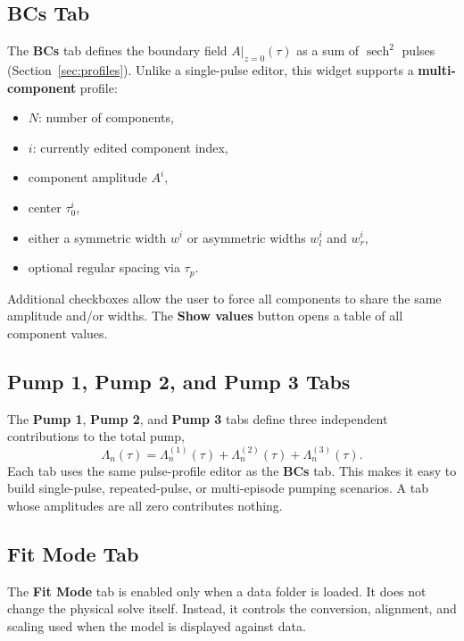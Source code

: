 \documentclass[12pt,a4paper]{article}
\newcommand{\tab}[1]{\textbf{#1}}
\newcommand{\sech}{\operatorname{sech}}
\begin{document}
\subsection{BCs Tab}

The \tab{BCs} tab defines the boundary field $A\vert_{z=0}(\tau)$ as a sum of
$\sech^2$ pulses (Section~\ref{sec:profiles}).
Unlike a single-pulse editor, this widget supports a \textbf{multi-component} profile:
\begin{itemize}[noitemsep]
  \item \textbf{$N$}: number of components,
  \item \textbf{$i$}: currently edited component index,
  \item component amplitude $A^i$,
  \item center $\tau_0^i$,
  \item either a symmetric width $w^i$ or asymmetric widths $w_l^i$ and $w_r^i$,
  \item optional regular spacing via $\tau_p$.
\end{itemize}

Additional checkboxes allow the user to force all components to share the same amplitude and/or widths.
The \textbf{Show values} button opens a table of all component values.

\subsection{Pump 1, Pump 2, and Pump 3 Tabs}

The \tab{Pump 1}, \tab{Pump 2}, and \tab{Pump 3} tabs define three
independent contributions to the total pump,
\begin{equation}
  \Lambda_n(\tau)=\Lambda_n^{(1)}(\tau)+\Lambda_n^{(2)}(\tau)+\Lambda_n^{(3)}(\tau).
\end{equation}
Each tab uses the same pulse-profile editor as the \tab{BCs} tab. This makes
it easy to build single-pulse, repeated-pulse, or multi-episode pumping
scenarios. A tab whose amplitudes are all zero contributes nothing.

\subsection{Fit Mode Tab}
\label{sec:fitmodetab}

The \tab{Fit Mode} tab is enabled only when a data folder is loaded. It does not change the physical solve
itself. Instead, it controls the conversion, alignment, and scaling used when the model is displayed against data.
\end{document}
